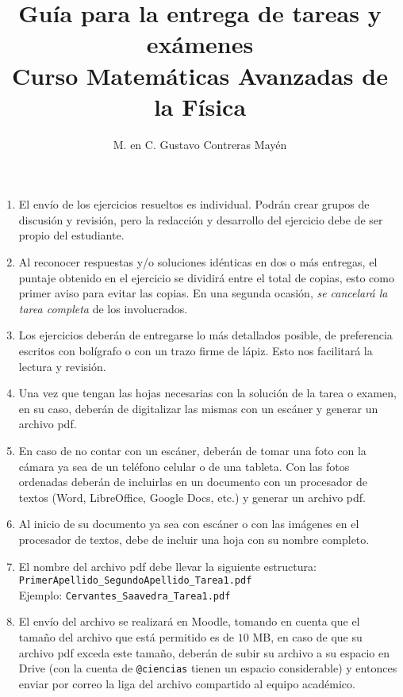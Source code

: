 
\usetikzlibrary{babel}
\setlength{\tabcolsep}{12pt}
\title{Guía para la entrega de tareas y exámenes\\ \large{Curso Matemáticas Avanzadas de la Física}\vspace{-3ex}}
\author{M. en C. Gustavo Contreras Mayén}
\date{ }

\vspace{-4cm}
\maketitle
\fontsize{14}{14}\selectfont
\begin{enumerate}
\item El envío de los ejercicios resueltos es individual. Podrán crear grupos de discusión y revisión, pero la redacción y desarrollo del ejercicio debe de ser propio del estudiante.
\item Al reconocer respuestas y/o soluciones idénticas en dos o más entregas, el puntaje obtenido en el ejercicio se dividirá entre el total de copias, esto como primer aviso para evitar las copias. En una segunda ocasión, \emph{se cancelará la tarea completa} de los involucrados.
\item Los ejercicios deberán de entregarse lo más detallados posible, de preferencia escritos con bolígrafo o con un trazo firme de lápiz. Esto nos facilitará la lectura y revisión.
\item Una vez que tengan las hojas necesarias con la solución de la tarea o examen, en su caso, deberán de digitalizar las mismas con un escáner y generar un archivo pdf.
\item En caso de no contar con un escáner, deberán de tomar una foto con la cámara ya sea de un teléfono celular o de una tableta. Con las fotos ordenadas deberán de incluirlas en un documento con un procesador de textos (Word, LibreOffice, Google Docs, etc.) y generar un archivo pdf.
\item Al inicio de su documento ya sea con escáner o con las imágenes en el procesador de textos, debe de incluir una hoja con su nombre completo.
\item El nombre del archivo pdf debe llevar la siguiente estructura: \hfill \break 
\hspace*{2cm} \texttt{PrimerApellido\_SegundoApellido\_Tarea1.pdf}
\\
Ejemplo: \texttt{Cervantes\_Saavedra\_Tarea1.pdf}
\item \label{inciso_tamano} El envío del archivo se realizará en Moodle, tomando en cuenta que el tamaño del archivo que está permitido es de $10$ MB, en caso de que su archivo pdf exceda este tamaño, deberán de subir su archivo a su espacio en Drive (con la cuenta de \texttt{@ciencias} tienen un espacio considerable) y entonces enviar por correo la liga del archivo compartido al equipo académico.

\end{enumerate}
